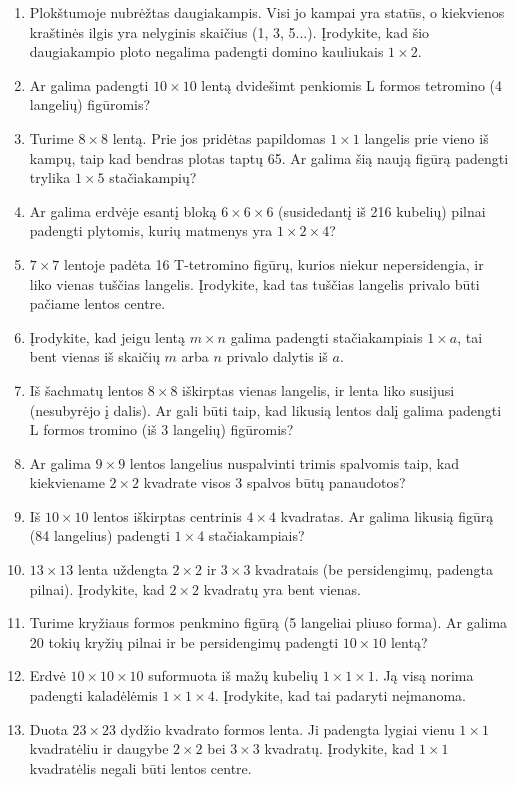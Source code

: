 \documentclass[11pt,a4paper]{scrartcl}
\begin{document}
\begin{enumerate}
    \item Plokštumoje nubrėžtas daugiakampis. Visi jo kampai yra statūs, o kiekvienos kraštinės ilgis yra nelyginis skaičius (1, 3, 5...). Įrodykite, kad šio daugiakampio ploto negalima padengti domino kauliukais $1 \times 2$.
    \item Ar galima padengti $10 \times 10$ lentą dvidešimt penkiomis L formos tetromino (4 langelių) figūromis?
    \item Turime $8 \times 8$ lentą. Prie jos pridėtas papildomas $1 \times 1$ langelis prie vieno iš kampų, taip kad bendras plotas taptų 65. Ar galima šią naują figūrą padengti trylika $1 \times 5$ stačiakampių?
    \item Ar galima erdvėje esantį bloką $6 \times 6 \times 6$ (susidedantį iš 216 kubelių) pilnai padengti plytomis, kurių matmenys yra $1 \times 2 \times 4$?
    \item $7 \times 7$ lentoje padėta 16 T-tetromino figūrų, kurios niekur nepersidengia, ir liko vienas tuščias langelis. Įrodykite, kad tas tuščias langelis privalo būti pačiame lentos centre.
    \item Įrodykite, kad jeigu lentą $m \times n$ galima padengti stačiakampiais $1 \times a$, tai bent vienas iš skaičių $m$ arba $n$ privalo dalytis iš $a$.
    \item Iš šachmatų lentos $8 \times 8$ iškirptas vienas langelis, ir lenta liko susijusi (nesubyrėjo į dalis). Ar gali būti taip, kad likusią lentos dalį galima padengti L formos tromino (iš 3 langelių) figūromis?
    \item Ar galima $9 \times 9$ lentos langelius nuspalvinti trimis spalvomis taip, kad kiekviename $2 \times 2$ kvadrate visos 3 spalvos būtų panaudotos?
    \item Iš $10 \times 10$ lentos iškirptas centrinis $4 \times 4$ kvadratas. Ar galima likusią figūrą (84 langelius) padengti $1 \times 4$ stačiakampiais?
    \item $13 \times 13$ lenta uždengta $2 \times 2$ ir $3 \times 3$ kvadratais (be persidengimų, padengta pilnai). Įrodykite, kad $2 \times 2$ kvadratų yra bent vienas.
    \item Turime kryžiaus formos penkmino figūrą (5 langeliai pliuso forma). Ar galima 20 tokių kryžių pilnai ir be persidengimų padengti $10 \times 10$ lentą?
    \item Erdvė $10 \times 10 \times 10$ suformuota iš mažų kubelių $1 \times 1 \times 1$. Ją visą norima padengti kaladėlėmis $1 \times 1 \times 4$. Įrodykite, kad tai padaryti neįmanoma.
    \item Duota $23 \times 23$ dydžio kvadrato formos lenta. Ji padengta lygiai vienu $1 \times 1$ kvadratėliu ir daugybe $2 \times 2$ bei $3 \times 3$ kvadratų. Įrodykite, kad $1 \times 1$ kvadratėlis negali būti lentos centre.

\end{enumerate}
\end{document}
